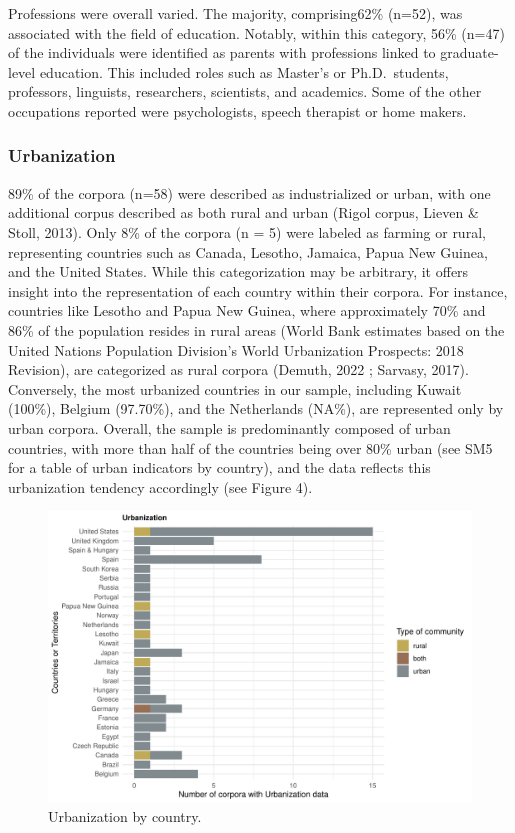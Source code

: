 \documentclass[
  man,floatsintext]{apa6}
\begin{document}
Professions were overall varied. The majority, comprising62\% (n=52), was associated with the field of education. Notably, within this category, 56\% (n=47) of the individuals were identified as parents with professions linked to graduate-level education. This included roles such as Master's or Ph.D.~students, professors, linguists, researchers, scientists, and academics. Some of the other occupations reported were psychologists, speech therapist or home makers.

\hypertarget{urbanization-1}{%
\subsubsection{Urbanization}\label{urbanization-1}}

89\% of the corpora (n=58) were described as industrialized or urban, with one additional corpus described as both rural and urban (Rigol corpus, Lieven \& Stoll, 2013). Only 8\% of the corpora (n = 5) were labeled as farming or rural, representing countries such as Canada, Lesotho, Jamaica, Papua New Guinea, and the United States. While this categorization may be arbitrary, it offers insight into the representation of each country within their corpora. For instance, countries like Lesotho and Papua New Guinea, where approximately 70\% and 86\% of the population resides in rural areas (World Bank estimates based on the United Nations Population Division's World Urbanization Prospects: 2018 Revision), are categorized as rural corpora (Demuth, 2022 ; Sarvasy, 2017). Conversely, the most urbanized countries in our sample, including Kuwait (100\%), Belgium (97.70\%), and the Netherlands (NA\%), are represented only by urban corpora.
Overall, the sample is predominantly composed of urban countries, with more than half of the countries being over 80\% urban (see SM5 for a table of urban indicators by country), and the data reflects this urbanization tendency accordingly (see Figure 4).

\begin{figure}
\centering
\includegraphics{CHILDES_short_files/figure-latex/figure4-1.pdf}
\caption{\label{fig:figure4}Urbanization by country.}
\end{figure}
\end{document}
